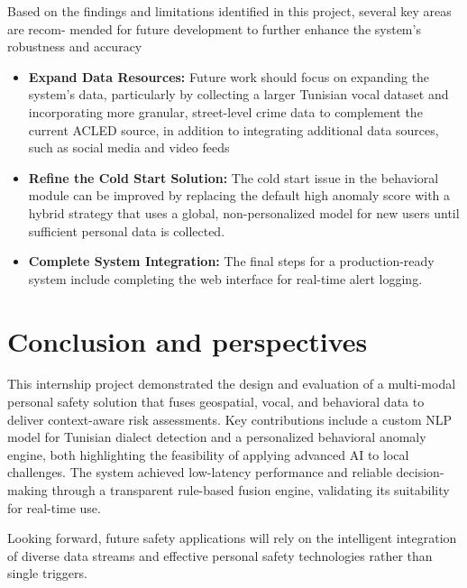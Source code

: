 \documentclass[12pt,a4paper,oneside,english]{book}
\begin{document}
Based on the findings and limitations identified in this project, several key areas are recom-
mended for future development to further enhance the system's robustness and accuracy
\begin{itemize}
    \item \textbf{Expand Data Resources:} Future work should focus on expanding the system's data, particularly by collecting a larger Tunisian vocal dataset and incorporating more granular, street-level crime data to complement the current ACLED source, in addition to integrating additional data sources, such as social media and video feeds
    
    \item \textbf{Refine the Cold Start Solution:} The cold start issue in the behavioral module can be improved by replacing the default high anomaly score with a hybrid strategy that uses a global, non-personalized model for new users until sufficient personal data is collected.
    
    \item \textbf{Complete System Integration:} The final steps for a production-ready system include completing the web interface for real-time alert logging.


\end{itemize}
\chapter*{Conclusion and perspectives}
\label{concusion and perspectives}



This internship project demonstrated the design and evaluation of a multi-modal personal safety solution that fuses geospatial, vocal, and behavioral data to deliver context-aware risk assessments. 
Key contributions include a custom NLP model for Tunisian dialect detection and a personalized behavioral anomaly engine, both highlighting the feasibility of applying advanced AI to local challenges. 
The system achieved low-latency performance and reliable decision-making through a transparent rule-based fusion engine, validating its suitability for real-time use. 

Looking forward, future safety applications will rely on the intelligent integration of diverse data streams and effective personal safety technologies rather than single triggers. 



\end{document}
